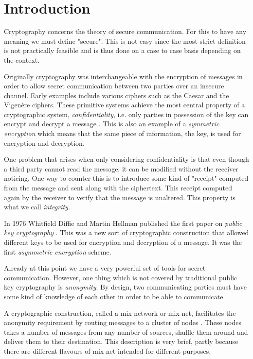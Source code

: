 \section{Introduction}

Cryptography concerns the theory of secure communication. For this to
have any meaning we must define "secure". This is not easy since the
most strict definition is not practically feasible and is thus done on
a case to case basis depending on the context.

Originally cryptography was interchangeable with the encryption of
messages in order to allow secret communication between two parties
over an insecure channel. Early examples include various ciphers such
as the Caesar and the Vigenère ciphers. These primitive systems
achieve the most central property of a cryptographic system,
\emph{confidentiality}, i.e. only parties in possession of the key can
encrypt and decrypt a message \cite[p.~3]{hac}. This is also an example of a
\emph{symmetric encryption} which means that the same piece of
information, the key, is used for encryption and decryption.

One problem that arises when only considering confidentiality is that
even though a third party cannot read the message, it can be modified
without the receiver noticing. One way to counter this is to introduce
some kind of "receipt" computed from the message and sent along with
the ciphertext. This receipt computed again by the receiver to verify
that the message is unaltered. This property is what we call
\emph{integrity}.

In 1976 Whitfield Diffie and Martin Hellman published the first paper
on \emph{public key cryptography} \cite[p.~2]{hac}. This was a new sort of
cryptographic construction that allowed different keys to be used for
encryption and decryption of a message. It was the first
\emph{asymmetric encryption} scheme.

Already at this point we have a very powerful set of tools for secret
communication. However, one thing which is not covered by traditional
public key cryptography is \emph{anonymity}. By design, two
communicating parties must have some kind of knowledge of each other
in order to be able to communicate. 

A cryptographic construction, called a mix network or mix-net,
facilitates the anonymity requirement by routing messages to a cluster
of nodes \cite[p.~1]{mixnets}. These nodes takes a number of messages
from any number of sources, shuffle them around and deliver them to
their destination. This description is very brief, partly because
there are different flavours of mix-net intended for different
purposes.

